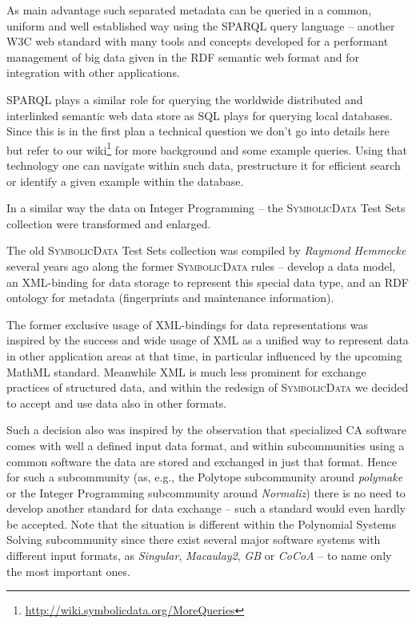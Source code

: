 \documentclass[a4paper,11pt]{article}
\def\SD{\textsc{Symbolic\-Data}}
\begin{document}
\begin{multicols}{2}
As main advantage such separated metadata can be queried in a common, uniform
and well established way using the SPARQL query language -- another W3C web
standard with many tools and concepts developed for a performant management of
big data given in the RDF semantic web format and for integration with other
applications.

SPARQL plays a similar role for querying the worldwide distributed and
interlinked semantic web data store as SQL plays for querying local databases.
Since this is in the first plan a technical question we don't go into details
here but refer to our wiki\footnote{
  \url{http://wiki.symbolicdata.org/MoreQueries}} for more background and some
example queries.  Using that technology one can navigate within such data,
prestructure it for efficient search or identify a given example within the
database.


In a similar way the data on Integer Programming -- the {\SD} Test Sets
collection were transformed and enlarged.

The old {\SD} Test Sets collection was compiled by \emph{Raymond Hemmecke}
several years ago along the former {\SD} rules -- develop a data model, an
XML-binding for data storage to represent this special data type, and an RDF
ontology for metadata (fingerprints and maintenance information).

The former exclusive usage of XML-bindings for data representations was
inspired by the success and wide usage of XML as a unified way to represent
data in other application areas at that time, in particular influenced by the
upcoming MathML standard.  Meanwhile XML is much less prominent for exchange
practices of structured data, and within the redesign of {\SD} we decided to
accept and use data also in other formats.

Such a decision also was inspired by the observation that specialized CA
software comes with well a defined input data format, and within
subcommunities using a common software the data are stored and exchanged in
just that format.  Hence for such a subcommunity (as, e.g., the Polytope
subcommunity around \emph{polymake} or the Integer Programming subcommunity
around \emph{Normaliz}) there is no need to develop another standard for data
exchange -- such a standard would even hardly be accepted.  Note that the
situation is different within the Polynomial Systems Solving subcommunity
since there exist several major software systems with different input formats,
as \emph{Singular}, \emph{Macaulay2}, \emph{GB} or \emph{CoCoA} -- to name
only the most important ones.


\end{multicols}
\end{document}
